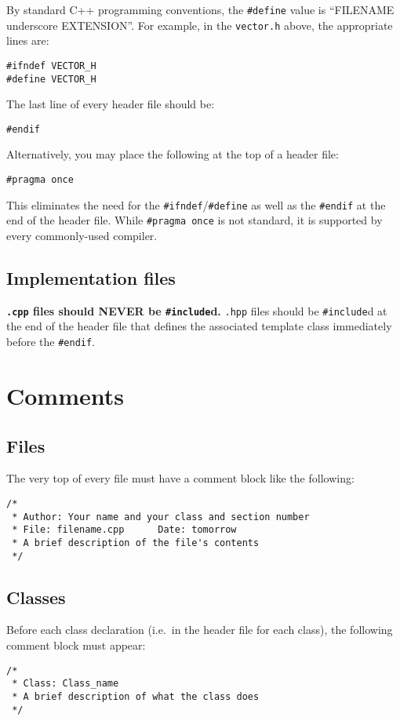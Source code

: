 \documentclass{article}
\newcommand{\code}[1]{\texttt{\colorbox{gray!30}{#1}}}
\begin{document}
By standard C++ programming conventions, the \code{\#define} value is ``FILENAME underscore EXTENSION''.
For example, in the \code{vector.h} above, the appropriate lines are:

\begin{lstlisting}
#ifndef VECTOR_H
#define VECTOR_H
\end{lstlisting}

The last line of every header file should be:

\begin{lstlisting}
#endif
\end{lstlisting}

Alternatively, you may place the following at the top of a header file:
\begin{lstlisting}
#pragma once
\end{lstlisting}

This eliminates the need for the \code{\#ifndef}/\code{\#define} as well as the \code{\#endif} at the end of the header file.
While \code{\#pragma once} is not standard, it is supported by every commonly-used compiler.

\subsection{Implementation files}
\textbf{\code{.cpp} files should NEVER be \code{\#include}d.}
\code{.hpp} files should be \code{\#include}d at the end of the header file that defines the associated template class immediately before the \code{\#endif}.

\section{Comments}

\subsection{Files}
The very top of every file must have a comment block like the following:
\begin{lstlisting}
/*
 * Author: Your name and your class and section number
 * File: filename.cpp      Date: tomorrow
 * A brief description of the file's contents
 */
\end{lstlisting}

\subsection{Classes}
Before each class declaration (i.e.\ in the header file for each class), the following comment block must appear:
\begin{lstlisting}
/*
 * Class: Class_name
 * A brief description of what the class does
 */
\end{lstlisting}
\end{document}
